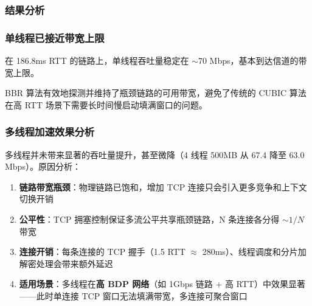 \documentclass[12pt]{article}
\begin{document}


\subsubsection{结果分析}

\subsubsection*{单线程已接近带宽上限}

在 186.8ms RTT 的链路上，单线程吞吐量稳定在 $\sim$70 Mbps，基本到达信道的带宽上限。

BBR 算法有效地探测并维持了瓶颈链路的可用带宽，避免了传统的 CUBIC 算法在高 RTT 场景下需要长时间慢启动填满窗口的问题。

\subsubsection*{多线程加速效果分析}

多线程并未带来显著的吞吐量提升，甚至微降（4 线程 500MB 从 67.4 降至 63.0 Mbps）。原因分析：

\begin{enumerate}
    \item \textbf{链路带宽瓶颈}：物理链路已饱和，增加 TCP 连接只会引入更多竞争和上下文切换开销
    \item \textbf{公平性}：TCP 拥塞控制保证多流公平共享瓶颈链路，N 条连接各分得 $\sim 1/N$ 带宽
    \item \textbf{连接开销}：每条连接的 TCP 握手（1.5 RTT $\approx$ 280ms）、线程调度和分片加解密处理会带来额外延迟
    \item \textbf{适用场景}：多线程在\textbf{高 BDP 网络}（如 1Gbps 链路 + 高 RTT）中效果显著——此时单连接 TCP 窗口无法填满带宽，多连接可聚合窗口
\end{enumerate}
\end{document}
